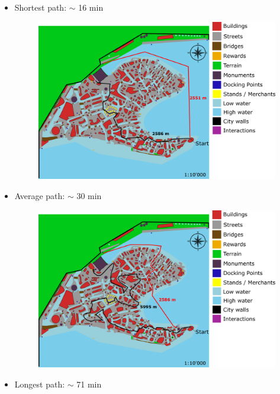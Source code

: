 \begin{itemize}
\item Shortest path: $\sim$ 16 min \\
\begin{figure}[H]
    \centering
\includegraphics[scale=0.3]{Images/Diagrams/dynamiapath1.png}
\end{figure}
\item Average path: $\sim$ 30 min \\
\begin{figure}[H]
    \centering
\includegraphics[scale=0.226]{Images/Diagrams/dynamiapath2.png}
\end{figure}
\item Longest path: $\sim$ 71 min \\
\begin{figure}[H]
    \centering

\end{figure}
\end{itemize}
